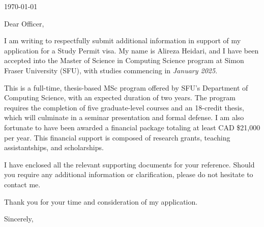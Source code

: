 \thispagestyle{plain}

\today\\

\coverLetterRecipient

Dear Officer,

I am writing to respectfully submit additional information in support of my application for a Study Permit visa. My name is Alireza Heidari, and I have been accepted into the Master of Science in Computing Science program at Simon Fraser University (SFU), with studies commencing in \textit{January 2025}.

This is a full-time, thesis-based MSc program offered by SFU’s Department of Computing Science, with an expected duration of two years. The program requires the completion of five graduate-level courses and an 18-credit thesis, which will culminate in a seminar presentation and formal defense. I am also fortunate to have been awarded a financial package totaling at least CAD \$21,000 per year. This financial support is composed of research grants, teaching assistantships, and scholarships.


I have enclosed all the relevant supporting documents for your reference. Should you require any additional information or clarification, please do not hesitate to contact me.


Thank you for your time and consideration of my application.


\noindent
Sincerely,\\
\applicantName

\clearpage
